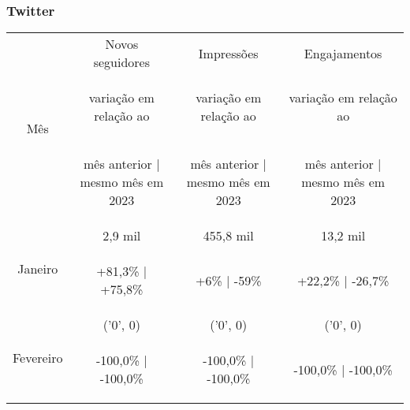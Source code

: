 \documentclass{article}%
\begin{document}
\subsubsection*{Twitter}%
\label{ssubsec:Twitter}%
\begin{minipage}{\textwidth}%
\centering%
\begin{tabular}{@{}|c|c|c|c|@{}}%
\toprule%
\multirow{3}{*}{Mês}&Novos seguidores&Impressões&Engajamentos\\%
&\begin{footnotesize}%
variação em relação ao%
\end{footnotesize}&\begin{footnotesize}%
variação em relação ao%
\end{footnotesize}&\begin{footnotesize}%
variação em relação ao%
\end{footnotesize}\\%
&\begin{footnotesize}%
mês anterior | mesmo mês em 2023%
\end{footnotesize}&\begin{footnotesize}%
mês anterior | mesmo mês em 2023%
\end{footnotesize}&\begin{footnotesize}%
mês anterior | mesmo mês em 2023%
\end{footnotesize}\\%
\midrule%
\multirow{2}{*}{Janeiro}&2,9 mil&455,8 mil&13,2 mil\\%
&\begin{footnotesize}%
+81,3\% | +75,8\%%
\end{footnotesize}&\begin{footnotesize}%
+6\% | {-}59\%%
\end{footnotesize}&\begin{footnotesize}%
+22,2\% | {-}26,7\%%
\end{footnotesize}\\%
\midrule%
\multirow{2}{*}{Fevereiro}&('0', 0) &('0', 0) &('0', 0) \\%
&\begin{footnotesize}%
{-}100,0\% | {-}100,0\%%
\end{footnotesize}&\begin{footnotesize}%
{-}100,0\% | {-}100,0\%%
\end{footnotesize}&\begin{footnotesize}%
{-}100,0\% | {-}100,0\%%
\end{footnotesize}\\\bottomrule%
%
\end{tabular}%
\end{minipage}%
\end{document}
